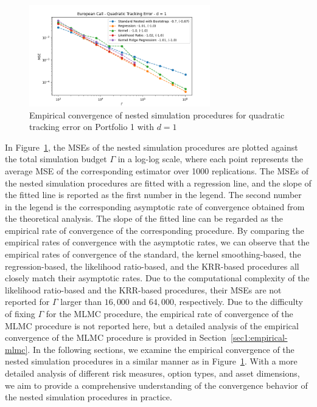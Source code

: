 \begin{figure}[ht!]
    \centering
    \includegraphics[width=0.7\textwidth]{./project1/figures/figure1.png}
    \caption{Empirical convergence of nested simulation procedures for quadratic tracking error on Portfolio 1 with $d=1$}
    \label{fig1:compareAll} 
\end{figure}
In Figure~\ref{fig1:compareAll}, the MSEs of the nested simulation procedures are plotted against the total simulation budget $\Gamma$ in a log-log scale, where each point represents the average MSE of the corresponding estimator over 1000 replications.
The MSEs of the nested simulation procedures are fitted with a regression line, and the slope of the fitted line is reported as the first number in the legend.
The second number in the legend is the corresponding asymptotic rate of convergence obtained from the theoretical analysis.
The slope of the fitted line can be regarded as the empirical rate of convergence of the corresponding procedure.
By comparing the empirical rates of convergence with the asymptotic rates, we can observe that the empirical rates of convergence of the standard, the kernel smoothing-based, the regression-based, the likelihood ratio-based, and the KRR-based procedures all closely match their asymptotic rates.
Due to the computational complexity of the likelihood ratio-based and the KRR-based procedures, their MSEs are not reported for $\Gamma$ larger than $16,000$ and $64,000$, respectively.
Due to the difficulty of fixing $\Gamma$ for the MLMC procedure, the empirical rate of convergence of the MLMC procedure is not reported here, but a detailed analysis of the empirical convergence of the MLMC procedure is provided in Section~\ref{sec1:empirical-mlmc}.
In the following sections, we examine the empirical convergence of the nested simulation procedures in a similar manner as in Figure~\ref{fig1:compareAll}.
With a more detailed analysis of different risk measures, option types, and asset dimensions, we aim to provide a comprehensive understanding of the convergence behavior of the nested simulation procedures in practice.

